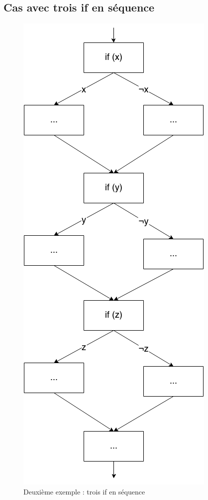 \documentclass[french]{article}
\begin{document}
  \subsection{Cas avec trois if en séquence}
  \begin{figure}
    \centering
    \includegraphics[scale=0.4]{./pictures/if_3seq.png}
    \caption{Deuxième exemple : trois if en séquence}
    \label{if_3seq}
  \end{figure}
  
\end{document}
